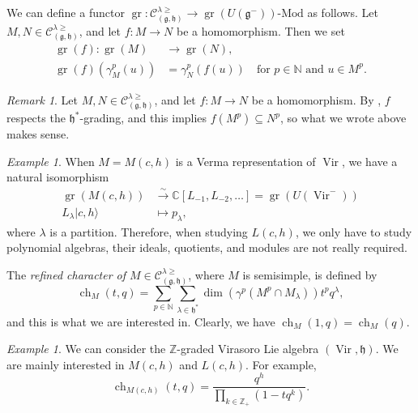 \documentclass[a4paper, 12pt, reqno]{amsart}
\theoremstyle{remark}
\newtheorem{remark}[theorem]{Remark}
\newtheorem{example}[theorem]{Example}
\DeclareMathOperator{\Vir}{Vir}
\DeclareMathOperator{\ch}{ch}
\DeclareMathOperator{\gr}{gr}
\begin{document}
We can define a functor $\gr: \mathcal{C}^{\lambda \ge}_{(\mathfrak{g}, \mathfrak{h})} \to \gr(U(\mathfrak{g}^-))\text{-Mod}$ as follows.
Let $M, N \in \mathcal{C}^{\lambda \ge}_{(\mathfrak{g}, \mathfrak{h})}$, and let $f: M \to N$ be a homomorphism.
Then we set
\begin{align*}
  \gr(f): \gr(M) &\to \gr(N), \\
  \gr(f)(\gamma_M^p(u)) &= \gamma_N^p(f(u)) \quad \text{for $p \in \mathbb{N}$ and $u \in M^p$}.
\end{align*}

\begin{remark}
  \label{rmk:2}
  Let $M, N \in \mathcal{C}^{\lambda \ge}_{(\mathfrak{g}, \mathfrak{h})}$, and let $f: M \to N$ be a homomorphism.
  By , $f$ respects the $\mathfrak{h}^*$-grading, and this implies $f(M^p) \subseteq N^p$, so what we wrote above makes sense.
\end{remark}

\begin{example}
  \label{exa:4}
  When $M = M(c, h)$ is a Verma representation of $\Vir$, we have a natural isomorphism
  \begin{align*}
    \gr(M(c, h)) &\xrightarrow{\sim} \mathbb{C}[L_{-1}, L_{-2}, \dots] = \gr(U(\Vir^{-})) \\
    L_{\lambda}|c, h\rangle & \mapsto p_{\lambda},
  \end{align*}
  where $\lambda$ is a partition.
  Therefore, when studying $L(c, h)$, we only have to study polynomial algebras, their ideals, quotients, and modules are not really required.
\end{example}

The \emph{refined character of $M \in \mathcal{C}^{\lambda \ge}_{(\mathfrak{g}, \mathfrak{h})}$}, where $M$ is semisimple, is defined by
\begin{equation*}
  \ch_M(t, q) = \sum_{p \in \mathbb{N}}\sum_{\lambda \in \mathfrak{h}^*}\dim(\gamma^p(M^p \cap M_{\lambda}))t^pq^{\lambda},
\end{equation*}
and this is what we are interested in.
Clearly, we have $\ch_M(1, q) = \ch_M(q)$.

\begin{example}
  \label{exa:5}
  We can consider the $\mathbb{Z}$-graded Virasoro Lie algebra $(\Vir, \mathfrak{h})$.
  We are mainly interested in $M(c, h)$ and $L(c, h)$.
  For example,
  \begin{equation*}
    \ch_{M(c, h)}(t, q) = \frac{q^h}{\prod_{k \in \mathbb{Z}_+}(1 - tq^k)}.
  \end{equation*}
\end{example}
\end{document}
